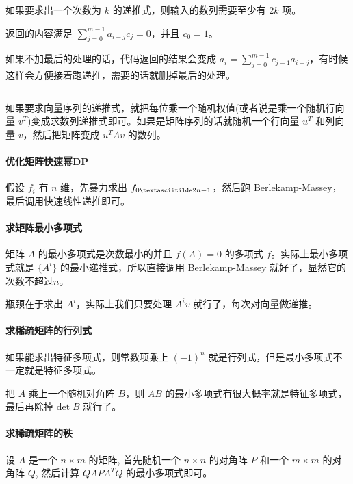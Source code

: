 如果要求出一个次数为 $k$ 的递推式，则输入的数列需要至少有 $2k$ 项。

返回的内容满足 $\sum_{j = 0} ^ {m - 1} a_{i - j} c_j = 0$，并且 $c_0 = 1$。

如果不加最后的处理的话，代码返回的结果会变成 $a_i = \sum_{j = 0} ^ {m - 1} c_{j - 1} a_{i - j}$，有时候这样会方便接着跑递推，需要的话就删掉最后的处理。

\inputminted{cpp}{src/Math/Berlekamp-Massey.cpp}

如果要求向量序列的递推式，就把每位乘一个随机权值(或者说是乘一个随机行向量 $v^T$)变成求数列递推式即可。如果是矩阵序列的话就随机一个行向量 $u^T$ 和列向量 $v$，然后把矩阵变成 $u^T A v$ 的数列。

\paragraph*{优化矩阵快速幂DP}

	假设 $f_i$ 有 $n$ 维，先暴力求出 $f_{0\textasciitilde 2n - 1}$，然后跑 Berlekamp-Massey，最后调用快速线性递推即可。

\paragraph*{求矩阵最小多项式}

	矩阵 $A$ 的最小多项式是次数最小的并且 $f(A) = 0$ 的多项式 $f$。实际上最小多项式就是 $\{A^i\}$ 的最小递推式，所以直接调用 Berlekamp-Massey 就好了，显然它的次数不超过$n$。

	瓶颈在于求出 $A^i$，实际上我们只要处理 $A^i v$ 就行了，每次对向量做递推。

\paragraph*{求稀疏矩阵的行列式}

	如果能求出特征多项式，则常数项乘上 $(-1)^n$ 就是行列式，但是最小多项式不一定就是特征多项式。

	把 $A$ 乘上一个随机对角阵 $B$，则 $AB$ 的最小多项式有很大概率就是特征多项式，最后再除掉 $\text{det}\;B$ 就行了。

\paragraph*{求稀疏矩阵的秩}

	设 $A$ 是一个 $n\times m$ 的矩阵, 首先随机一个 $n\times n$ 的对角阵 $P$ 和一个 $m\times m$ 的对角阵 $Q$, 然后计算 $Q A P A^T Q$ 的最小多项式即可。

